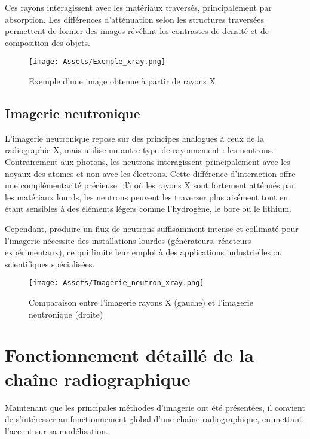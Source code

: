 \documentclass[12pt,a4paper]{report}
\begin{document}
Ces rayons interagissent avec les matériaux traversés, principalement par absorption. Les différences d’atténuation selon les structures traversées permettent de former des images révélant les contrastes de densité et de composition des objets.

\begin{figure}[H]
    \centering
    \texttt{[image: Assets/Exemple\_xray.png]}
    \caption{Exemple d'une image obtenue à partir de rayons X}
    \label{fig:images}
\end{figure}

\subsection{Imagerie neutronique}
L’imagerie neutronique repose sur des principes analogues à ceux de la radiographie X, mais utilise un autre type de rayonnement : les neutrons. Contrairement aux photons, les neutrons interagissent principalement avec les noyaux des atomes et non avec les électrons. Cette différence d’interaction offre une complémentarité précieuse : là où les rayons X sont fortement atténués par les matériaux lourds, les neutrons peuvent les traverser plus aisément tout en étant sensibles à des éléments légers comme l’hydrogène, le bore ou le lithium.

Cependant, produire un flux de neutrons suffisamment intense et collimaté pour l’imagerie nécessite des installations lourdes (générateurs, réacteurs expérimentaux), ce qui limite leur emploi à des applications industrielles ou scientifiques spécialisées.
\begin{figure}[H]
    \centering
    \texttt{[image: Assets/Imagerie\_neutron\_xray.png]}
    \caption{Comparaison entre l'imagerie rayons X (gauche) et l'imagerie neutronique (droite)}
    \label{fig:images}
\end{figure}

\section{Fonctionnement détaillé de la chaîne radiographique}
Maintenant que les principales méthodes d’imagerie ont été présentées, il convient de s’intéresser au fonctionnement global d’une chaîne radiographique, en mettant l’accent sur sa modélisation.
\end{document}
